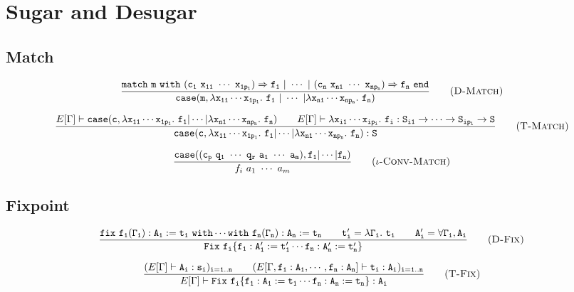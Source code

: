 \section{Sugar and Desugar}

\subsection{Match}
\begin{Def}
    \begin{equation*}
    \frac{\tt match\ m\ with\ (c_1\ x_{11}\ \cdots\ x_{1p_1})\Rightarrow f_1\ |\ \cdots\ |\ (c_n\ x_{n1}\ \cdots\ x_{np_n})
        \Rightarrow f_n\ end}
        {\tt case(m,\lambda x_{11}\cdots x_{1p_1}.\ f_1\ |\ \cdots\ |\lambda x_{n1}\cdots x_{np_n}.\ f_n)}
        \tag{\sc D-Match}
    \end{equation*}
\end{Def}

\begin{equation}
\frac{E[\Gamma]\vdash{\tt case(c,\lambda x_{11}\cdots x_{1p_1}.\ f_1|\cdots|\lambda x_{n1}\cdots x_{np_n}.\ f_n)}\qquad 
    E[\Gamma]\vdash{\tt \lambda x_{i1}\cdots x_{ip_i}.\ f_i:S_{i1}\to\cdots\to S_{ip_i}\to S}}
    {\tt case(c,\lambda x_{11}\cdots x_{1p_1}.\ f_1|\cdots|\lambda x_{n1}\cdots x_{np_n}.\ f_n):S}
    \tag{\sc T-Match}
\end{equation}

\begin{equation*}
\frac{\tt case((c_p\ q_1\ \cdots\ q_r\ a_1\ \cdots\ a_m),f_1|\cdots|f_n)}
    {f_i\ a_1\ \cdots\ a_m}
    \tag{\sc $\iota$-Conv-Match}
\end{equation*}

\subsection{Fixpoint}
\begin{Def}
    \begin{equation*}
    \frac{\tt fix\ f_1(\Gamma_1):A_1:=t_1\ with\cdots with\ f_n(\Gamma_n):A_n:=t_n\qquad 
        t'_i=\lambda\Gamma_i.\ t_i\qquad A'_i=\forall\Gamma_i,A_i}
        {\tt Fix\ f_i\{f_1:A'_1:=t'_1\cdots f_n:A'_n:=t'_n\}}
        \tag{\sc D-Fix}
    \end{equation*}
\end{Def}

\begin{equation*}
\frac{(E[\Gamma]\vdash {\tt A_i:s_i)_{i=1..n}}\qquad (E[\Gamma,\tt f_1:A_1,\cdots,f_n:A_n]\vdash t_i:A_i)_{i=1..n}}
    {E[\Gamma]\vdash\tt Fix\ f_i\{f_1:A_1:=t_1\cdots f_n:A_n:=t_n\}:A_i}
    \tag{\sc T-Fix}
\end{equation*}

